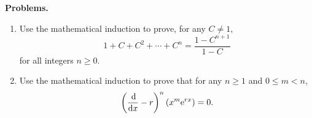 \documentclass[10pt]{article}
\title{}
\date{}
\newcommand{\e}{{\rm e}}
\DeclareMathOperator{\xd}{d\!}
\begin{document}
\noindent
{\bf Problems.}
\begin{enumerate}
\item
Use the mathematical induction to prove, for any $C \ne 1$, 
\[
1 + C + C^2 + \cdots + C^{n} = \frac{1-C^{n+1}}{1-C}
\]
for all integers $n\geq0$.
\item 
Use the mathematical induction to prove that for any $n\geq 1$ and $0\leq m<n$,
\[
\left(\frac{\xd }{\xd x} - r\right)^n(x^m\e^{rx}) = 0.
\]
\end{enumerate}
\end{document}
